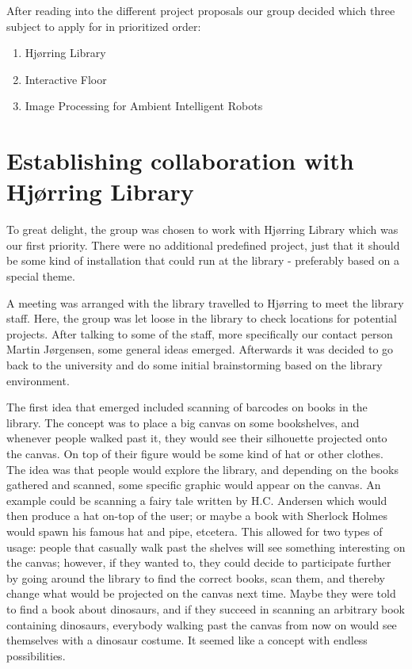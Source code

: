 After reading into the different project proposals our group decided which three subject to apply for in prioritized order:

\begin{enumerate} 
\item Hj{\o}rring Library 
\item Interactive Floor 
\item Image Processing for Ambient Intelligent Robots 
\end{enumerate}

\section{Establishing collaboration with Hj{\o}rring Library}
To great delight, the group was chosen to work with Hj{\o}rring Library which was our first priority. There were no additional predefined project, just that it should be some kind of installation that could run at the library - preferably based on a special theme.

A meeting was arranged with the library travelled to Hj{\o}rring to meet the library staff. Here, the group was let loose in the library to check locations for potential projects. After talking to some of the staff, more specifically our contact person Martin J{\o}rgensen, some general ideas emerged. Afterwards it was decided to go back to the university and do some initial brainstorming based on the library environment.

The first idea that emerged included scanning of barcodes on books in the library. The concept was to place a big canvas on some bookshelves, and whenever people walked past it, they would see their silhouette projected onto the canvas. On top of their figure would be some kind of hat or other clothes. The  idea was that people would explore the library, and depending on the books gathered and scanned, some specific graphic would appear on the canvas. An example could be scanning a fairy tale written by H.C. Andersen which would then produce a hat on-top of the user; or maybe a book with Sherlock Holmes would spawn his famous hat and pipe, etcetera. This allowed for two types of usage: people that casually walk past the shelves will see something interesting on the canvas; however, if they wanted to, they could decide to participate further by going around the library to find the correct books, scan them, and thereby change what would be projected on the canvas next time. Maybe they were told to find a book about dinosaurs, and if they succeed in scanning an arbitrary book containing dinosaurs, everybody walking past the canvas from now on would see themselves with a dinosaur costume. It seemed like a concept with endless possibilities.

